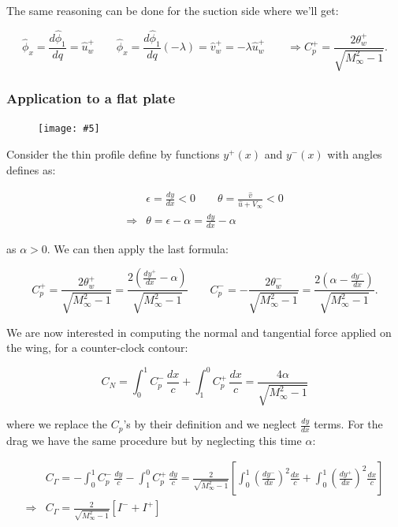 \documentclass[british,french,11pt, a4paper, openany]{article}
\newcommand{\wrapfig}[6]{%
	\begin{figure}%
		\vspace{-5mm}%
		\texttt{[image: \#5]}%
		\captionof{figure}{}%
		\label{#6}%
	\end{figure}%
}
\begin{document}
The same reasoning can be done for the suction side where we'll get:

\begin{equation}
\hat{\phi} _x = \frac{d\hat{\phi}_1}{dq} = \hat{u}^+_w \qquad \hat{\phi} _x = \frac{d\hat{\phi}_1}{dq}(-\lambda) = \hat{v}^+_w = -\lambda \hat{u}^+_w\qquad \Rightarrow C_p^+ = \frac{2\theta_w^+}{\sqrt{M^2_\infty - 1}}.
\end{equation}

\subsubsection{Application to a flat plate}
\wrapfig{8}{l}{7.5}{0.1}{ch6/18}{fig:6.18}
Consider the thin profile define by functions $y^+(x)$ and $y^-(x)$ with angles defines as:

\begin{equation}
\begin{aligned}
&\epsilon = \frac{dy}{dx} <0 \qquad \theta = \frac{\hat{v}}{\hat{u} +V_\infty} <0 \\
\Rightarrow &\theta = \epsilon - \alpha = \frac{dy}{dx} - \alpha
\end{aligned}
\end{equation}

as $\alpha > 0$. We can then apply the last formula: 

\begin{equation}
C_p^+ = \frac{2\theta_w^+}{\sqrt{M^2_\infty - 1}} = \frac{2\left( \frac{dy^+}{dx} -\alpha \right)}{\sqrt{M^2_\infty - 1}} \qquad C_p^- = -\frac{2\theta_w^-}{\sqrt{M^2_\infty - 1}} = \frac{2\left( \alpha -\frac{dy^-}{dx}\right)}{\sqrt{M^2_\infty - 1}}.
\end{equation}

We are now interested in computing the normal and tangential force applied on the wing, for a counter-clock contour: 

\begin{equation}
C_N = \int _0 ^1 C_p ^- \, \frac{dx}{c} + \int _1 ^0 C_p ^+ \, \frac{dx}{c} = \frac{4\alpha }{\sqrt{M_\infty ^2-1}}
\end{equation}

where we replace the $C_p$'s by their definition and we neglect $\frac{dy}{dx}$ terms. For the drag we have the same procedure but by neglecting this time $\alpha$:

\begin{equation}
\begin{aligned}
&C_\Gamma = -\int _0 ^1 C_p ^- \, \frac{dy}{c} - \int _1 ^0 C_p ^+ \, \frac{dy}{c} = \frac{2}{\sqrt{M_\infty ^2-1}} \left[ \int _0^1 \left(\frac{dy^-}{dx} \right)^2 \frac{dx}{c} + \int _0^1 \left(\frac{dy^+}{dx} \right)^2 \frac{dx}{c} \right]\\
\Rightarrow &C_\Gamma =  \frac{2}{\sqrt{M_\infty ^2-1}} [I^- + I^+]
\end{aligned}
\end{equation}
\end{document}
